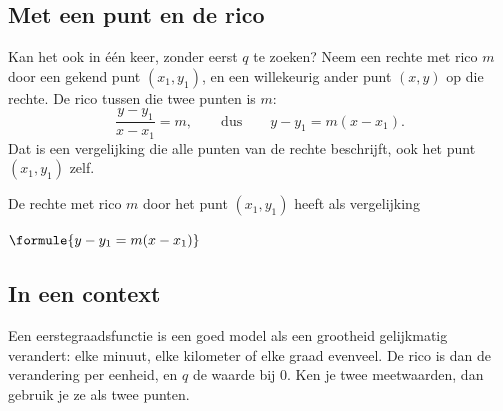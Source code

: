 \begin{oefeningen}
\end{oefeningen}

\subsection{Met een punt en de rico}

Kan het ook in één keer, zonder eerst $q$ te zoeken? Neem een rechte met rico $m$ door een gekend punt $(x_1, y_1)$, en een willekeurig ander punt $(x, y)$ op die rechte. De rico tussen die twee punten is $m$:
\[\frac{y - y_1}{x - x_1} = m, \qquad\text{dus}\qquad y - y_1 = m(x - x_1).\]
Dat is een vergelijking die alle punten van de rechte beschrijft, ook het punt $(x_1, y_1)$ zelf.

\begin{theorie}
De rechte met rico $m$ door het punt $(x_1, y_1)$ heeft als vergelijking

\vspace{1mm}
\qquad $\formule{y - y_1 = m(x - x_1)}$
\end{theorie}


\begin{oefeningen}
\end{oefeningen}

\subsection{In een context}

Een eerstegraadsfunctie is een goed model als een grootheid gelijkmatig verandert: elke minuut, elke kilometer of elke graad evenveel. De rico is dan de verandering per eenheid, en $q$ de waarde bij 0. Ken je twee meetwaarden, dan gebruik je ze als twee punten.

